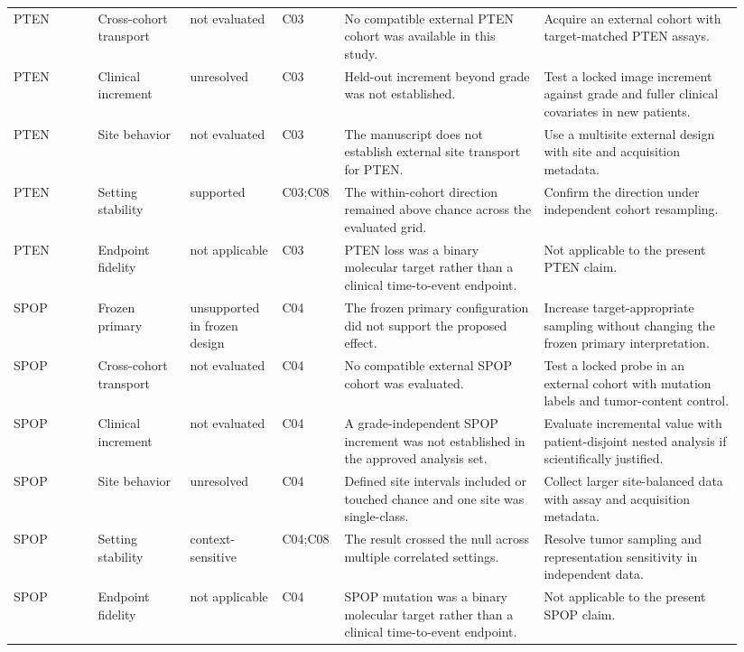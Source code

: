 \begin{landscape}
\begin{longtable}{@{}p{0.11\linewidth}p{0.12\linewidth}p{0.12\linewidth}p{0.07\linewidth}p{0.26\linewidth}p{0.26\linewidth}@{}}
PTEN & Cross-cohort transport & not evaluated & C03 & No compatible external PTEN cohort was available in this study. & Acquire an external cohort with target-matched PTEN assays. \\
PTEN & Clinical increment & unresolved & C03 & Held-out increment beyond grade was not established. & Test a locked image increment against grade and fuller clinical covariates in new patients. \\
PTEN & Site behavior & not evaluated & C03 & The manuscript does not establish external site transport for PTEN. & Use a multisite external design with site and acquisition metadata. \\
PTEN & Setting stability & supported & C03;C08 & The within-cohort direction remained above chance across the evaluated grid. & Confirm the direction under independent cohort resampling. \\
PTEN & Endpoint fidelity & not applicable & C03 & PTEN loss was a binary molecular target rather than a clinical time-to-event endpoint. & Not applicable to the present PTEN claim. \\
SPOP & Frozen primary & unsupported in frozen design & C04 & The frozen primary configuration did not support the proposed effect. & Increase target-appropriate sampling without changing the frozen primary interpretation. \\
SPOP & Cross-cohort transport & not evaluated & C04 & No compatible external SPOP cohort was evaluated. & Test a locked probe in an external cohort with mutation labels and tumor-content control. \\
SPOP & Clinical increment & not evaluated & C04 & A grade-independent SPOP increment was not established in the approved analysis set. & Evaluate incremental value with patient-disjoint nested analysis if scientifically justified. \\
SPOP & Site behavior & unresolved & C04 & Defined site intervals included or touched chance and one site was single-class. & Collect larger site-balanced data with assay and acquisition metadata. \\
SPOP & Setting stability & context-sensitive & C04;C08 & The result crossed the null across multiple correlated settings. & Resolve tumor sampling and representation sensitivity in independent data. \\
SPOP & Endpoint fidelity & not applicable & C04 & SPOP mutation was a binary molecular target rather than a clinical time-to-event endpoint. & Not applicable to the present SPOP claim. \\

\end{longtable}
\end{landscape}
